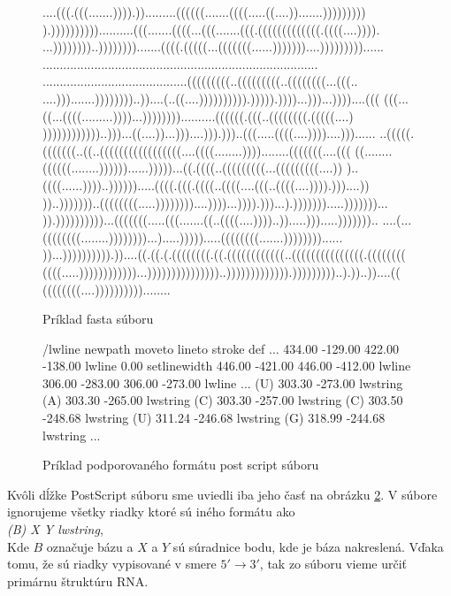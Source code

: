 \begin{figure}[H]
\begin{code}[fontsize=\scriptsize, frame=none, samepage=true]
....(((.(((.......)))).)).........((((((.......((((.....((....)).......)))))))))
).))))))))))..........(((.......((((...(((.......(((.(((((((((((((.((((....)))).
...))))))))..)))))))).......((((.(((((...(((((((......)))))))....)))))))))......
................................................................................
..........................................(((((((((..(((((((((..((((((((...(((..
....))).......))))))))..))....(..((....)))))))))).))))).))))...)))...))))....(((
(((...((...((((.........))))...))))))))..........((((((.(((..((((((((.(((((....)
))))))))))))..)))...((....))...)))....))).)))..(((.....((((....))))....)))......
..(((((.(((((((..((..(((((((((((((((((....((((........))))........(((((((....(((
((........((((((........))))))......)))))...((.((((..(((((((((...(((((((((....))
)..((((......))))..)))))).....((((.(((.((((..((((....(((..((((....)))).)))....))
))..)))))))..((((((((.....))))))))....))))...)))).)))...).))))))).....)))))))...
)).))))))))))...(((((((.....(((.......((..((((....))))..)).....))).....)))))))..
....(...((((((((........))))))))...).....))))).....((((((((.......))))))))......
))...)))))))))).))....((.((.(.((((((((.((.((((((((((((..(((((((((((((((.((((((((
((((.....))))))))))))...)))))))))))))))..))))))))))))).)))))))))..).))..))....((
((((((((....))))))))))........
  \end{code}
  \caption{Príklad fasta súboru}
  \label{obr:human_fasta}
\end{figure}

\begin{figure}[H]
\begin{code}[fontsize=\scriptsize, frame=none, samepage=true]
/lwline {newpath moveto lineto stroke} def
  ...
434.00 -129.00 422.00 -138.00 lwline
0.00 setlinewidth
446.00 -421.00 446.00 -412.00 lwline
306.00 -283.00 306.00 -273.00 lwline
  ...
(U) 303.30 -273.00 lwstring
(A) 303.30 -265.00 lwstring
(C) 303.30 -257.00 lwstring
(C) 303.50 -248.68 lwstring
(U) 311.24 -246.68 lwstring
(G) 318.99 -244.68 lwstring
  ...
\end{code}
\caption{Príklad podporovaného formátu post script súboru}
\label{obr:ps_format}
\end{figure}

Kvôli dĺžke PostScript súboru sme uviedli iba jeho časť na obrázku \ref{obr:ps_format}.
V súbore ignorujeme všetky riadky ktoré sú iného formátu ako
\\
\textit{(B) X Y lwstring},
\\
Kde $B$ označuje bázu a $X$ a $Y$ sú súradnice bodu, kde je báza nakreslená.
Vďaka tomu, že sú riadky vypisované v smere $5' \to 3'$, tak zo súboru
vieme určiť primárnu štruktúru RNA.




